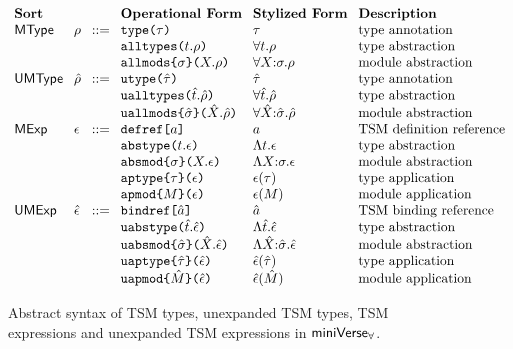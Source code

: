 \begin{figure}
\hspace{-8px}$\arraycolsep=4pt\begin{array}{lllllll}
\textbf{Sort} & & & \textbf{Operational Form} & \textbf{Stylized Form} & \textbf{Description}\\
\mathsf{MType} & \rho & ::= & \aetype{\tau} & \tau & \text{type annotation}\\
&&& \aealltypes{t}{\rho} & \alltypes{t}{\rho} & \text{type abstraction}\\
&&& \aeallmods{\sigma}{X}{\rho} & \allmods{X}{\sigma}{\rho} & \text{module abstraction}\\
\mathsf{UMType} & \urho & ::= & \autype{\utau} & \utau & \text{type annotation}\\
&&& \aualltypes{\ut}{\urho} & \alltypes{\ut}{\urho} & \text{type abstraction}\\
&&& \auallmods{\usigma}{\uX}{\urho} & \allmods{\uX}{\usigma}{\urho} & \text{module abstraction}\\
\mathsf{MExp} & \epsilon & ::= & \adefref{a} & a & \text{TSM definition reference}\\
&&& \aeabstype{t}{\epsilon} & \abstype{t}{\epsilon} & \text{type abstraction}\\
&&& \aeabsmod{\sigma}{X}{\epsilon} & \absmod{X}{\sigma}{\epsilon} & \text{module abstraction}\\
&&& \aeaptype{\tau}{\epsilon} & \aptype{\epsilon}{\tau} & \text{type application}\\
&&& \aeapmod{M}{\epsilon} & \aptype{\epsilon}{M} & \text{module application}\\
\mathsf{UMExp} & \uepsilon & ::= & \abindref{\tsmv} & \tsmv & \text{TSM binding reference}\\
&&& \auabstype{\ut}{\uepsilon} & \abstype{\ut}{\uepsilon} & \text{type abstraction}\\
&&& \auabsmod{\usigma}{\uX}{\uepsilon} & \absmod{\uX}{\usigma}{\uepsilon} & \text{module abstraction}\\
&&& \auaptype{\utau}{\uepsilon} & \aptype{\uepsilon}{\utau} & \text{type application}\\
&&& \auapmod{\uM}{\uepsilon} & \apmod{\uepsilon}{\uM} & \text{module application}
\end{array}$
\caption[Syntax of TSM types and expressions in $\miniVerseParam$]{Abstract syntax of TSM types, unexpanded TSM types, TSM expressions and unexpanded TSM expressions in $\miniVerseParam$.}
\label{fig:P-macro-expressions-types}
\end{figure}

